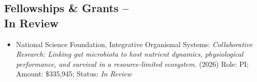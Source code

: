 \documentclass[margin,line,12pt]{res}
\begin{document}
\begin{resume}


\section{\sc Fellowships \& Grants -- \\  In Review}
\begin{itemize}




\item National Science Foundation, Integrative Organismal Systems: \emph{Collaborative Research: Linking gut microbiota to host nutrient dynamics, physiological performance, and survival in a resource-limited ecosystem.} (2026) Role: PI; Amount: \$335,945; Status: \emph{In Review}







\end{itemize}




\end{resume}
\end{document}
